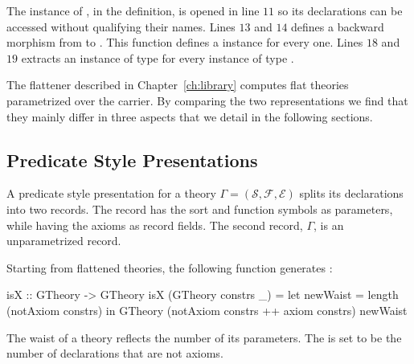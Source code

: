\noindent The instance of , in the  definition, is opened in line $11$ so its declarations can be accessed without qualifying their names. 
Lines $13$ and $14$ defines a backward morphism from  to . This  function defines a  instance for every  one. 
Lines $18$ and $19$ extracts an instance of type  for every instance of type . 

The flattener described in Chapter~\ref{ch:library} computes flat theories parametrized over the carrier. By comparing the two representations we find that they mainly differ in three aspects that we detail in the following sections. 
\subsection{Predicate Style Presentations}
A predicate style presentation for a theory $\Gamma = (\mathcal{S},\mathcal{F}, \mathcal{E})$ splits its declarations into two records. The  record has the sort and function symbols as parameters, while having the axioms as record fields. The second record, $\Gamma$, is an unparametrized record. 

Starting from flattened theories, the following function generates : 
\begin{hscode}
isX :: GTheory -> GTheory
isX (GTheory constrs _) =
  let newWaist = length (notAxiom constrs) 
  in GTheory (notAxiom constrs ++ axiom constrs) newWaist
\end{hscode}
\noindent The waist of a theory reflects the number of its parameters. The  is set to be the number of declarations that are not axioms. 

